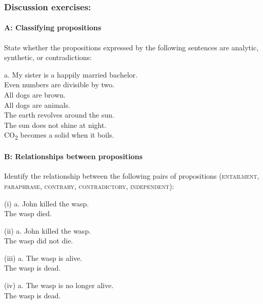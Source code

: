 \subsubsection{Discussion exercises:}\label{sec:}
\paragraph{A: Classifying propositions}

State whether the propositions expressed by the following sentences are analytic, synthetic, or contradictions:

\ea
  a. My sister is a happily married bachelor.\\
\ex Even numbers are divisible by two.\\
\ex All dogs are brown.\\
\ex All dogs are animals.\\
\ex The earth revolves around the sun.\\
\ex The sun does not shine at night.\\
\ex CO\textsubscript{2} becomes a solid when it boils.
\z

\paragraph{B: Relationships between propositions}

Identify the relationship between the following pairs of propositions (\textsc{entailment, paraphrase, contrary,} \textsc{contradictory,} \textsc{independent}):

\begin{stylepoints}
(i)  a. John killed the wasp.\\
\ex The wasp died.
\end{stylepoints}

\begin{stylepoints}
(ii)  a. John killed the wasp.\\
\ex The wasp did not die.
\end{stylepoints}

\begin{stylepoints}
(iii)  a. The wasp is alive.\\
\ex The wasp is dead.
\end{stylepoints}

\begin{stylepoints}
(iv)  a. The wasp is no longer alive.\\
\ex The wasp is dead.
\end{stylepoints}

